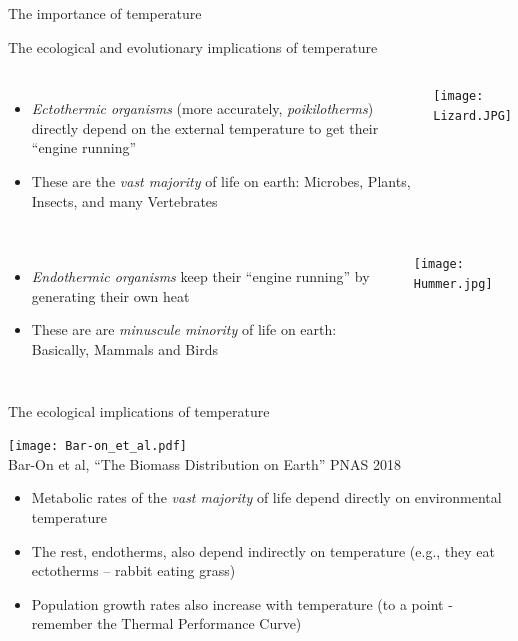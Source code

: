 \begin{frame}{The importance of temperature}
\begin{itemize}
\end{itemize}
 
\end{frame}

\begin{frame}{The ecological and evolutionary implications of temperature}

  \begin{columns}[c]
    \centering
    \begin{itemize}[<+->]\setlength{\itemindent}{0em}\itemsep4pt
      \item {\it Ectothermic organisms} (more accurately, {\it poikilotherms}) directly depend on the external temperature to get their ``engine running''   
      \item These are the {\it vast majority} of life on earth: Microbes, Plants, Insects, and many Vertebrates
    \end{itemize}
    \pause \texttt{[image: Lizard.JPG]}
  \end{columns}
  \vspace{12pt}
  \pause
  \begin{columns}[c]
    \centering
    \begin{itemize}[<+->]\setlength{\itemindent}{0em}\itemsep4pt
      \item {\it Endothermic organisms} keep their ``engine running'' by generating their own heat
      \item These are are {\it minuscule minority} of life on earth: Basically, Mammals and Birds
    \end{itemize}
    \pause \texttt{[image: Hummer.jpg]}
  \end{columns}
  
  \end{frame}

\begin{frame}{The ecological implications of temperature}

  \begin{center}
    \texttt{[image: Bar-on\_et\_al.pdf]}\\
    {\tiny Bar-On et al, ``The Biomass Distribution on Earth'' PNAS 2018}
  \end{center}\par

  \begin{itemize}[<+->]\setlength{\itemindent}{0em}\itemsep4pt
      \item Metabolic rates of the {\it vast majority} of life depend directly on environmental temperature
      \item The rest, endotherms, also depend indirectly on temperature (e.g., they eat ectotherms -- rabbit eating grass)
      \item Population growth rates also increase with temperature (to a point - remember the Thermal Performance Curve)
  \end{itemize}

  \end{frame}

